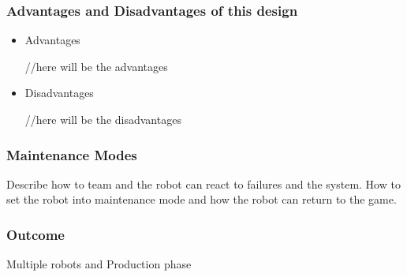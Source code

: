 \subsubsection{Advantages and Disadvantages of this design} 

\begin{itemize}

\item Advantages


//here will be the advantages


\item Disadvantages

//here will be the disadvantages


\end{itemize}


\subsubsection{Maintenance Modes}

Describe how to team and the robot can react to failures and the system. How to set the robot into maintenance mode and how the robot can return to the game. 


\subsubsection{Outcome}

Multiple robots and Production phase







